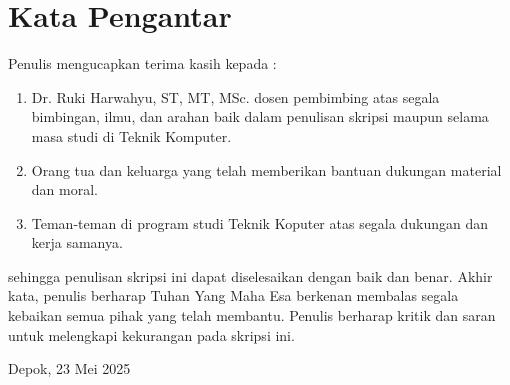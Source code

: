 \chapter*{Kata Pengantar}
Penulis mengucapkan terima kasih kepada :
\begin{enumerate}
  \item Dr. Ruki Harwahyu, ST, MT, MSc. dosen pembimbing atas segala bimbingan, ilmu, dan arahan baik dalam penulisan skripsi maupun selama masa studi di Teknik Komputer.
  \item Orang tua dan keluarga yang telah memberikan bantuan dukungan material dan moral.
  \item Teman-teman di program studi Teknik Koputer atas segala dukungan dan kerja samanya.
\end{enumerate}

sehingga penulisan skripsi ini dapat diselesaikan dengan baik dan benar. Akhir kata, penulis  berharap Tuhan Yang Maha Esa berkenan membalas segala kebaikan semua pihak yang telah membantu. Penulis berharap kritik dan saran untuk melengkapi kekurangan pada skripsi ini.

\vspace*{0.1cm}
\begin{flushright}
	Depok, 23 Mei 2025\\[0.1cm]
	\vspace*{1cm}
	\penulis

\end{flushright}
